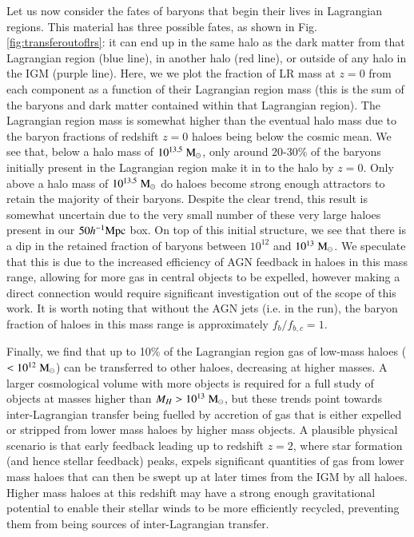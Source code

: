 Let us now consider the fates of baryons that begin their lives in Lagrangian
regions. This material has three possible fates, as shown in Fig.
\ref{fig:transferoutoflrs}: it can end up in the same halo as the dark matter
from that Lagrangian region (blue line), in another halo (red line), or
outside of any halo in the IGM (purple line). Here, we we plot the fraction
of LR mass at $z=0$ from each component as a function of their Lagrangian
region mass (this is the sum of the baryons and dark matter contained within
that Lagrangian region). The Lagrangian region mass is somewhat higher than
the eventual halo mass due to the baryon fractions of redshift $z=0$ haloes
being below the cosmic mean. We see that, below a halo mass of
$10^{13.5}\;{\rm M}_{\odot}{}$, only around 20-30\% of the baryons initially present in
the Lagrangian region make it in to the halo by $z=0$. Only above a halo mass
of $10^{13.5}\;{\rm M}_{\odot}{}$ do haloes become strong enough attractors to retain
the majority of their baryons. Despite the clear trend, this result is
somewhat uncertain due to the very small number of these very large haloes
present in our $50h^{-1}{\rm Mpc}{}$ box. On top of this initial structure, we see that
there is a dip in the retained fraction of baryons between $10^{12}$ and
$10^{13}\;{\rm M}_{\odot}{}$. We speculate that this is due to the increased efficiency
of AGN feedback in haloes in this mass range, allowing for more
gas in central objects to be expelled, however making a direct connection
would require significant investigation out of the scope of this work. It is
worth noting that without the AGN jets (i.e. in the \nojet{} run), the baryon
fraction of haloes in this mass range is approximately $f_b / f_{b,c} = 1$.

Finally, we find that up to 10\% of the Lagrangian region gas of low-mass
haloes ($<10^{12} \;{\rm M}_{\odot}{}$) can be transferred to other haloes, decreasing at
higher masses. A larger cosmological volume with more objects is required for
a full study of objects at masses higher than $M_H > 10^{13}\;{\rm M}_{\odot}{}$, but
these trends point towards inter-Lagrangian transfer being fuelled by
accretion of gas that is either expelled or stripped from lower mass haloes
by higher mass objects. A plausible physical scenario is that early
feedback leading up to redshift $z=2$, where star formation (and hence
stellar feedback) peaks, expels significant quantities of gas from lower mass
haloes that can then be swept up at later times from the IGM by all haloes.
Higher mass haloes at this redshift may have a strong enough gravitational
potential to enable their stellar winds to be more efficiently recycled,
preventing them from being sources of inter-Lagrangian transfer.

